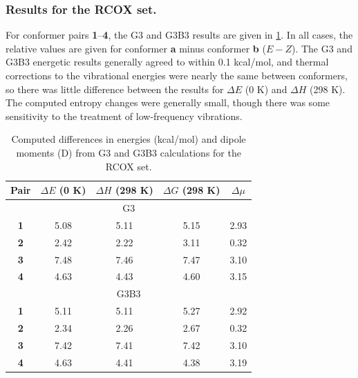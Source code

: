 \documentclass[12pt]{report}
\begin{document}

\subsubsection{Results for the RCOX set.}

For conformer pairs \textbf{1}--\textbf{4}, the G3 and G3B3 results are given in \cref{rcoxg3g3b3}. In all cases, the relative values are given for conformer \textbf{a} minus conformer \textbf{b} ($E - Z$). The G3 and G3B3 energetic results generally agreed to within 0.1 kcal/mol, and thermal corrections to the vibrational energies were nearly the same between conformers, so there was little difference between the results for $\Delta E$ (0 K) and $\Delta H$ (298 K). The computed entropy changes were generally small, though there was some sensitivity to the treatment of low-frequency vibrations.

\bigskip
\begin{table}[ht]
\caption{Computed differences in energies (kcal/mol) and dipole moments (D) from G3 and G3B3 calculations for the RCOX set.}
\centering
\begin{tabular}{ccccc}
\toprule
Pair   & $\Delta E$ (0 K) & $\Delta H$ (298 K) & $\Delta G$ (298 K) & $\Delta \mu$ \\
\midrule
\multicolumn{5}{c}{G3} \\
\midrule
\textbf{1} & 5.08           & 5.11                 & 5.15               & 2.93\\
\textbf{2} & 2.42           & 2.22                 & 3.11               & 0.32\\
\textbf{3} & 7.48           & 7.46                 & 7.47               & 3.10\\
\textbf{4} & 4.63           & 4.43                 & 4.60               & 3.15\\
\midrule
\multicolumn{5}{c}{G3B3} \\
\midrule
\textbf{1} & 5.11           & 5.11                 & 5.27               & 2.92\\
\textbf{2} & 2.34           & 2.26                 & 2.67               & 0.32\\
\textbf{3} & 7.42           & 7.41                 & 7.42               & 3.10\\
\textbf{4} & 4.63           & 4.41                 & 4.38               & 3.19\\
\bottomrule
\end{tabular}
\label{rcoxg3g3b3}
\end{table}
\end{document}
